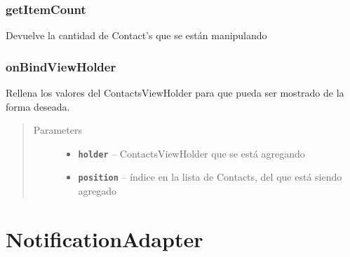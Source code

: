 \documentclass[letterpaper,10pt,english]{sphinxmanual}
\begin{document}
\subsubsection{getItemCount}
\label{Adapter/ContactsAdapter:getitemcount}

\begin{fulllineitems}
\label{Adapter/ContactsAdapter:com.fiuba.tallerii.jobify.ContactsAdapter.getItemCount()}
Devuelve la cantidad de Contact's que se están manipulando

\end{fulllineitems}



\subsubsection{onBindViewHolder}
\label{Adapter/ContactsAdapter:onbindviewholder}

\begin{fulllineitems}
\label{Adapter/ContactsAdapter:com.fiuba.tallerii.jobify.ContactsAdapter.onBindViewHolder(ContactsViewHolder, int)}
Rellena los valores del ContactsViewHolder para que pueda ser mostrado de la forma deseada.
\begin{quote}\begin{description}
\item[{Parameters}] \leavevmode\begin{itemize}
\item {} 
\textbf{\texttt{holder}} -- ContactsViewHolder que se está agregando

\item {} 
\textbf{\texttt{position}} -- índice en la lista de Contacts, del  que está siendo agregado

\end{itemize}

\end{description}\end{quote}

\end{fulllineitems}



\section{NotificationAdapter}
\label{Adapter/NotificationsAdapter:notificationadapter}\label{Adapter/NotificationsAdapter::doc}
\end{document}
